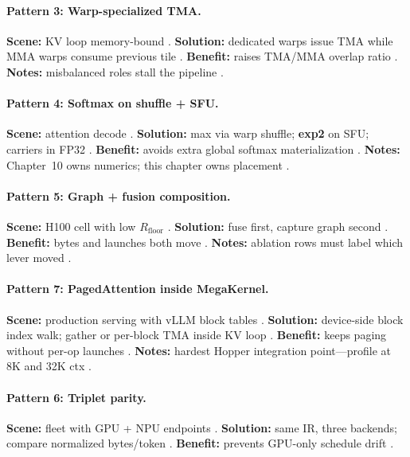 \paragraph{Pattern 3: Warp-specialized TMA.}
\textbf{Scene:} KV loop memory-bound \citep{semianalysis2024tma}.
\textbf{Solution:} dedicated warps issue TMA while MMA warps consume previous tile \citep{nvidia2022hopper}.
\textbf{Benefit:} raises TMA/MMA overlap ratio \citep{patel2025llminference}.
\textbf{Notes:} misbalanced roles stall the pipeline \citep{yirage2026}.

\paragraph{Pattern 4: Softmax on shuffle + SFU.}
\textbf{Scene:} attention decode \citep{dao2022flashattention}.
\textbf{Solution:} max via warp shuffle; \textbf{exp2} on SFU; carriers in FP32 \citep{dlbook,liu2024deepseekv3}.
\textbf{Benefit:} avoids extra global softmax materialization \citep{memoryfloor2026}.
\textbf{Notes:} Chapter~10 owns numerics; this chapter owns placement \citep{dao2022flashattention}.

\paragraph{Pattern 5: Graph + fusion composition.}
\textbf{Scene:} H100 cell with low $R_{\mathrm{floor}}$ \citep{memoryfloor2026}.
\textbf{Solution:} fuse first, capture graph second \citep{nvidia2024cudagraphs,taxbreak2026}.
\textbf{Benefit:} bytes and launches both move \citep{patel2025llminference}.
\textbf{Notes:} ablation rows must label which lever moved \citep{memoryfloor2026}.

\paragraph{Pattern 7: PagedAttention inside MegaKernel.}
\textbf{Scene:} production serving with vLLM block tables \citep{kwon2023vllm}.
\textbf{Solution:} device-side block index walk; gather or per-block TMA inside KV loop \citep{dao2023flashdecoding,yirage2026}.
\textbf{Benefit:} keeps paging without per-op launches \citep{taxbreak2026}.
\textbf{Notes:} hardest Hopper integration point---profile at 8K and 32K ctx \citep{patel2025llminference}.

\paragraph{Pattern 6: Triplet parity.}
\textbf{Scene:} fleet with GPU + NPU endpoints \citep{amd2024xdna,patel2025llminference}.
\textbf{Solution:} same IR, three backends; compare normalized bytes/token \citep{yirage2026}.
\textbf{Benefit:} prevents GPU-only schedule drift \citep{chen2020compilerbasedhardw}.

